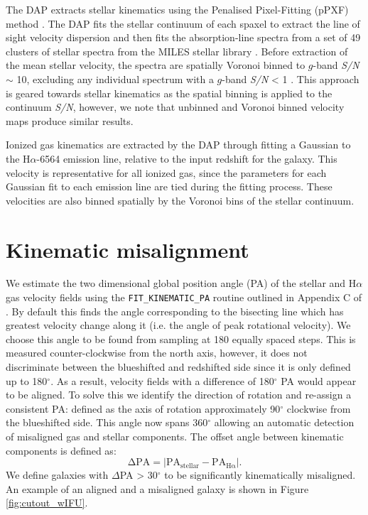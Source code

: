 The DAP extracts stellar kinematics using the Penalised Pixel-Fitting (pPXF) method \citep{cappellari2004,cappellari2017}. The DAP fits the stellar continuum of each spaxel to extract the line of sight velocity dispersion and then fits the absorption-line spectra from a set of 49 clusters of stellar spectra from the MILES stellar library \citep{sanchez2006,falcon2011}. Before extraction of the mean stellar velocity, the spectra are spatially Voronoi binned to $g$-band \textit{S/N} $\sim$ 10, excluding any individual spectrum with a $g$-band \textit{S/N} < 1 \citep{cappellari2003}. This approach is geared towards stellar kinematics as the spatial binning is applied to the continuum \textit{S/N}, however, we note that unbinned and Voronoi binned velocity maps produce similar results. 

Ionized gas kinematics are extracted by the DAP through fitting a Gaussian to the H$\alpha$-6564 emission line, relative to the input redshift for the galaxy. This velocity is representative for all ionized gas, since the parameters for each Gaussian fit to each emission line are tied during the fitting process. These velocities are also binned spatially by the Voronoi bins of the stellar continuum. 

\section{Kinematic misalignment} \label{sec:kin_mis}
We estimate the two dimensional global position angle (PA) of the stellar and H$\alpha$ gas velocity fields using the \texttt{FIT\_KINEMATIC\_PA} routine outlined in Appendix C of \citet{krajnovic2006}. By default this finds the angle corresponding to the bisecting line which has greatest velocity change along it (i.e. the angle of peak rotational velocity). We choose this angle to be found from sampling at 180 equally spaced steps. This is measured counter-clockwise from the north axis, however, it does not discriminate between the blueshifted and redshifted side since it is only defined up to 180$^{\circ}$. As a result, velocity fields with a difference of 180$^{\circ}$ PA would appear to be aligned. To solve this we identify the direction of rotation and re-assign a consistent PA: defined as the axis of rotation approximately 90$^{\circ}$ clockwise from the blueshifted side. This angle now spans 360$^{\circ}$ allowing an automatic detection of misaligned gas and stellar components. The offset angle between kinematic components is defined as: 
\begin{equation} \label{eq:delPA}
\mathrm{\Delta PA = |PA_{stellar} - PA_{H\alpha}|. }
\end{equation}
We define galaxies with $\Delta$PA > 30$^{\circ}$ to be significantly kinematically misaligned. An example of an aligned and a misaligned galaxy is shown in Figure \ref{fig:cutout_wIFU}. 


